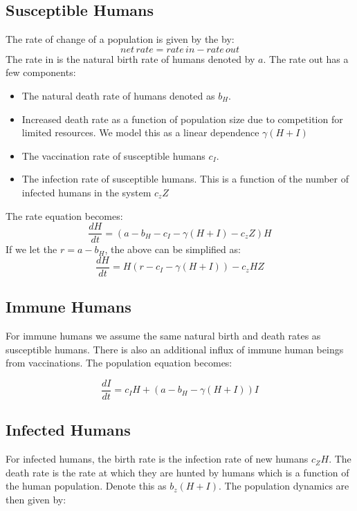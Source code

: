 \documentclass[
	12pt
]{article}
\begin{document}
\subsection{Susceptible Humans}
The rate of change of a population is given by the by:
\begin{equation}
net \, rate = rate \, in - rate \, out
\end{equation}
The rate in is the natural birth rate of humans denoted by $a$. The rate out has a few components:
\begin{itemize}
\item The natural death rate of humans denoted as $b_H$.
\item Increased death rate as a function of population size due to competition for limited resources. We model this as a linear dependence $\gamma(H+I)$
\item The vaccination rate of susceptible humans $c_I$.
\item The infection rate of susceptible humans. This is a function of the number of infected humans in the system $c_zZ$
\end{itemize}
The rate equation becomes:
\begin{equation}
\frac{dH}{dt} = (a-b_H-c_I-\gamma(H+I)-c_zZ)H
\end{equation}
If we let the $r = a-b_H$, the above can be simplified as:
\begin{equation}
\frac{dH}{dt} = H(r - c_I-\gamma(H+I))-c_zHZ
\end{equation}

\subsection{Immune Humans}
For immune humans we assume the same natural birth and death rates as susceptible humans. There is also an additional influx of immune human beings from vaccinations. The population equation becomes:

\begin{equation}
\frac{dI}{dt} = c_IH+(a-b_H-\gamma(H+I))I
\end{equation}

\subsection{Infected Humans}
For infected humans, the birth rate is the infection rate of new humans $c_ZH$. The death rate is the rate at which they are hunted by humans which is a function of the human population. Denote this as $b_z(H+I)$. The population dynamics are then given by:
\end{document}
